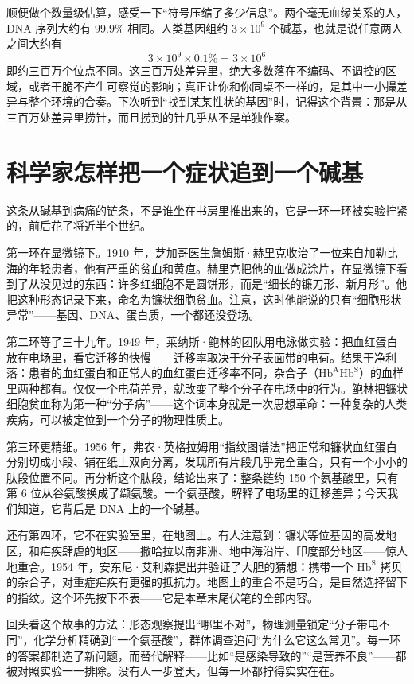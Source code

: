 顺便做个数量级估算，感受一下“符号压缩了多少信息”。两个毫无血缘关系的人，DNA 序列大约有 $99.9\%$ 相同。人类基因组约 $3\times 10^{9}$ 个碱基，也就是说任意两人之间大约有
\[3\times 10^{9}\times 0.1\% = 3\times 10^{6}\]
即约三百万个位点不同。这三百万处差异里，绝大多数落在不编码、不调控的区域，或者干脆不产生可察觉的影响；真正让你和你同桌不一样的，是其中一小撮差异与整个环境的合奏。下次听到“找到某某性状的基因”时，记得这个背景：那是从三百万处差异里捞针，而且捞到的针几乎从不是单独作案。

\section{科学家怎样把一个症状追到一个碱基}

\begin{zhengju}
这条从碱基到病痛的链条，不是谁坐在书房里推出来的，它是一环一环被实验拧紧的，前后花了将近半个世纪。

第一环在显微镜下。1910 年，芝加哥医生詹姆斯·赫里克收治了一位来自加勒比海的年轻患者，他有严重的贫血和黄疸。赫里克把他的血做成涂片，在显微镜下看到了从没见过的东西：许多红细胞不是圆饼形，而是“细长的镰刀形、新月形”。他把这种形态记录下来，命名为镰状细胞贫血。注意，这时他能说的只有“细胞形状异常”——基因、DNA、蛋白质，一个都还没登场。

第二环等了三十九年。1949 年，莱纳斯·鲍林的团队用电泳做实验：把血红蛋白放在电场里，看它迁移的快慢——迁移率取决于分子表面带的电荷。结果干净利落：患者的血红蛋白和正常人的血红蛋白迁移率不同，杂合子（$\mathrm{Hb^{A}Hb^{S}}$）的血样里两种都有。仅仅一个电荷差异，就改变了整个分子在电场中的行为。鲍林把镰状细胞贫血称为第一种“分子病”——这个词本身就是一次思想革命：一种复杂的人类疾病，可以被定位到一个分子的物理性质上。

第三环更精细。1956 年，弗农·英格拉姆用“指纹图谱法”把正常和镰状血红蛋白分别切成小段、铺在纸上双向分离，发现所有片段几乎完全重合，只有一个小小的肽段位置不同。再分析这个肽段，结论出来了：整条链约 150 个氨基酸里，只有第 6 位从谷氨酸换成了缬氨酸。一个氨基酸，解释了电场里的迁移差异；今天我们知道，它背后是 DNA 上的一个碱基。

还有第四环，它不在实验室里，在地图上。有人注意到：镰状等位基因的高发地区，和疟疾肆虐的地区——撒哈拉以南非洲、地中海沿岸、印度部分地区——惊人地重合。1954 年，安东尼·艾利森提出并验证了大胆的猜想：携带一个 $\mathrm{Hb^{S}}$ 拷贝的杂合子，对重症疟疾有更强的抵抗力。地图上的重合不是巧合，是自然选择留下的指纹。这个环先按下不表——它是本章末尾伏笔的全部内容。

回头看这个故事的方法：形态观察提出“哪里不对”，物理测量锁定“分子带电不同”，化学分析精确到“一个氨基酸”，群体调查追问“为什么它这么常见”。每一环的答案都制造了新问题，而替代解释——比如“是感染导致的”“是营养不良”——都被对照实验一一排除。没有人一步登天，但每一环都拧得实实在在。
\end{zhengju}

